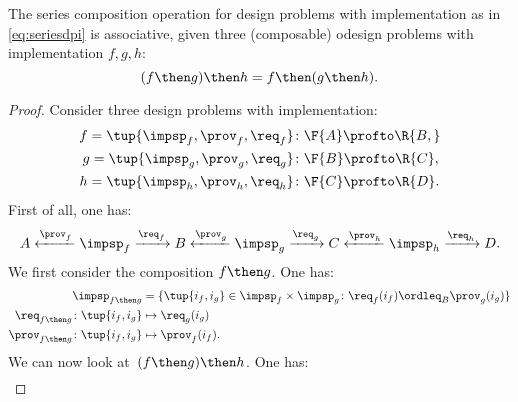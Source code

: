 {    \begin{lemma}
        The series composition operation for design problems with implementation as in \cref{eq:seriesdpi} is associative, \ie  given three (composable) odesign problems with implementation $f,g,h$:
        \begin{equation}
            (f\then g)
            \then h = f\then (g\then h).
        \end{equation}
    \end{lemma}
    \begin{proof}
        Consider three design problems with implementation:
        \begin{equation}
            \begin{aligned}
                f=\tup{{\impsp_f, \prov_f, \req_f} } & \colon \F{A} \profto\R{B,}  \\
                g=\tup{\impsp_g, \prov_g, \req_g}    & \colon \F{B} \profto \R{C}, \\
                h=\tup{\impsp_h, \prov_h, \req_h}    & \colon \F{C} \profto \R{D}. 
            \end{aligned}
        \end{equation}
        First of all, one has:
        \begin{equation}
            A \xleftarrow{\prov_f} \impsp_f \xrightarrow{\req_f} B
            \xleftarrow{\prov_g} \impsp_g \xrightarrow{\req_g} C
            \xleftarrow{\prov_h} \impsp_h \xrightarrow{\req_h} D.
        \end{equation}
        We first consider the composition $f\then g$.
        One has:
        \begin{equation}
            \begin{aligned}
                \impsp_{f\then g}                       & = \{                  
                \tup{i_f,i_g} \in \impsp_f \times \impsp_g \colon
                \req_f(i_f) \ordleq_{B} \prov_g(i_g)
                \}                                                              \\
                \req_{f\then g}  \colon  \tup{i_f,i_g}  & \mapsto \req_g(i_g)   \\
                \prov_{f\then g}  \colon  \tup{i_f,i_g} & \mapsto \prov_f(i_f). 
            \end{aligned}
        \end{equation}
        We can now look at~$(f\then g)\then h$.
        One has:
        \begin{equation}
            \begin{aligned}

\end{aligned}
\end{equation}
\end{proof}}

